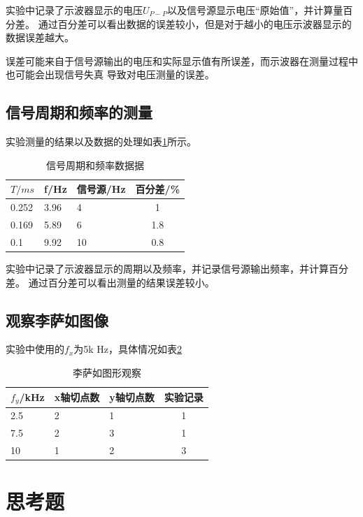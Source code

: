 \documentclass{ctexart}
\begin{document}
  实验中记录了示波器显示的电压$U_{P-P}$以及信号源显示电压“原始值”，并计算量百分差。
  通过百分差可以看出数据的误差较小，但是对于越小的电压示波器显示的数据误差越大。

  误差可能来自于信号源输出的电压和实际显示值有所误差，而示波器在测量过程中也可能会出现信号失真
  导致对电压测量的误差。

  \subsection{信号周期和频率的测量}
  实验测量的结果以及数据的处理如表\ref{zhouqiceliang}所示。
  \begin{table}[h]
    \centering   
    \caption{信号周期和频率数据据}\label{zhouqiceliang}
    \begin{tabular}{| l || l || l || c |}
        \hline
        $T/ms$ & f/Hz & 信号源/Hz & 百分差/\%\\
        \hline
        0.252 & 3.96 & 4 & 1\\
        \hline
        0.169 & 5.89 & 6 & 1.8\\
        \hline
        0.1 & 9.92 & 10 & 0.8\\
        \hline                       
    \end{tabular}
  \end{table}

  实验中记录了示波器显示的周期以及频率，并记录信号源输出频率，并计算百分差。
  通过百分差可以看出测量的结果误差较小。

  \subsection{观察李萨如图像}
  实验中使用的$f_{x}$为5k Hz，具体情况如表\ref{lisaruguancha}
  \begin{table}[h]
    \centering   
    \caption{李萨如图形观察}\label{lisaruguancha}
    \begin{tabular}{| l || l || l || c |}
        \hline
        $f_{y}$/kHz & x轴切点数 & y轴切点数 & 实验记录\\
        \hline
        2.5 & 2 & 1 & 1\\
        \hline
        7.5 & 2 & 3 & 1\\
        \hline
        10 & 1 & 2 & 3\\
        \hline                       
    \end{tabular}
  \end{table}

\section{思考题}
\end{document}
